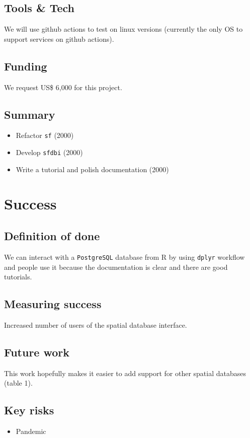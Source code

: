 \documentclass[]{article}
\providecommand{\tightlist}{%
  \setlength{\itemsep}{0pt}\setlength{\parskip}{0pt}}
\begin{document}
\hypertarget{tools-tech}{%
\subsection{Tools \& Tech}\label{tools-tech}}

We will use github actions to test on linux versions (currently the only
OS to support services on github actions).

\hypertarget{funding}{%
\subsection{Funding}\label{funding}}

We request US\$ 6,000 for this project.

\hypertarget{summary}{%
\subsection{Summary}\label{summary}}

\begin{itemize}
\tightlist
\item
  Refactor \texttt{sf} (2000)
\item
  Develop \texttt{sfdbi} (2000)
\item
  Write a tutorial and polish documentation (2000)
\end{itemize}

\hypertarget{success}{%
\section{Success}\label{success}}

\hypertarget{definition-of-done}{%
\subsection{Definition of done}\label{definition-of-done}}

We can interact with a \texttt{PostgreSQL} database from R by using
\texttt{dplyr} workflow and people use it because the documentation is
clear and there are good tutorials.

\hypertarget{measuring-success}{%
\subsection{Measuring success}\label{measuring-success}}

Increased number of users of the spatial database interface.

\hypertarget{future-work}{%
\subsection{Future work}\label{future-work}}

This work hopefully makes it easier to add support for other spatial
databases (table 1).

\hypertarget{key-risks}{%
\subsection{Key risks}\label{key-risks}}

\begin{itemize}
\tightlist
\item
  Pandemic
\end{itemize}
\end{document}
